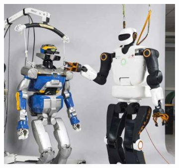 \begin{figure}[h]
\begin{subfigure}{0.485\textwidth}
        \includegraphics[width=\textwidth]{figures/Robots-humanoides_HRP2_Talos_crop.jpg}
    \end{subfigure}%
    

\end{figure}
